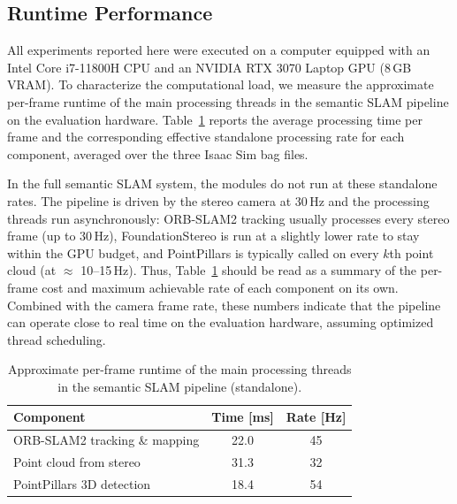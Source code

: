 \documentclass[letterpaper, 10 pt, conference]{IEEEtran}  %
\begin{document}
\subsection{Runtime Performance}
All experiments reported here were executed  on a computer equipped with an Intel Core i7-11800H CPU and an NVIDIA RTX 3070 Laptop GPU (8\,GB VRAM). To characterize the computational load, we measure the approximate per-frame runtime of the main processing threads in the semantic SLAM pipeline on the evaluation hardware. Table~\ref{tab:runtime} reports the average processing time per frame and the corresponding effective standalone processing rate for each component, averaged over the three Isaac Sim bag files.

In the full semantic SLAM system, the modules do not run at these standalone rates. The pipeline is driven by the stereo camera at 30\,Hz and the processing threads run asynchronously: ORB-SLAM2 tracking usually processes every stereo frame (up to 30\,Hz), FoundationStereo is run at a slightly lower rate to stay within the GPU budget, and PointPillars is typically called on every $k$th point cloud (at $\approx$ 10--15\,Hz). Thus, Table~\ref{tab:runtime} should be read as a summary of the per-frame cost and maximum achievable rate of each component on its own. Combined with the camera frame rate, these numbers indicate that the pipeline can operate close to real time on the evaluation hardware, assuming optimized thread scheduling.

\begin{table}[t]
\centering
\caption{Approximate per-frame runtime of the main processing threads in the semantic SLAM pipeline (standalone).}
\label{tab:runtime}
\setlength{\tabcolsep}{3pt}
\renewcommand{\arraystretch}{1.05}
\footnotesize
\begin{tabular}{p{}cc}
\toprule
\textbf{Component} & \textbf{Time [ms]} & \textbf{Rate [Hz]} \\
\midrule
ORB-SLAM2 tracking \& mapping & 22.0 & 45 \\
Point cloud from stereo  & 31.3 & 32 \\
PointPillars 3D detection     & 18.4 & 54 \\
\bottomrule
\end{tabular}
\end{table}
\end{document}
